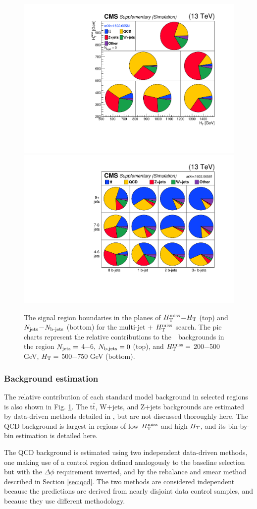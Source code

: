\begin{figure}[tb!]
\centering
\includegraphics[height=0.442\textwidth]{figures/SusySearches/Ra2b2015/aux/MC_BG_Pie_NB0.pdf}
\hspace{-1cm}
\includegraphics[height=0.445\textwidth]{figures/SusySearches/Ra2b2015/aux/MC_BG_Pie_vs_NJets_NBJets.pdf}
\caption{The signal region boundaries in the planes of $H_{\text{T}}^{\rm miss}$$-$$H_{\rm T}$ (top) and $N_{\rm jets}$$-$$N_{\text{b-jets}}$ (bottom) for the multi-jet $+$ $H_{\text{T}}^{\rm miss}$ 
search. The pie charts represent the relative contributions
 to the~\sm~backgrounds in the region $N_{\rm jets}=$ 4$-$6, $N_{\text{b-jets}}=0$ (top), and $H_{\text{T}}^{\rm miss}=$ 200$-$500 GeV, $H_{\rm T}=$ 500$-$750 GeV (bottom).}
\label{fig:ra2bArray}
\end{figure}


\subsubsection{Background estimation}
The relative contribution of each standard model background in selected regions is also shown in Fig. \ref{fig:ra2bArray}. The t$\bar{\text{t}}$, W$+$jets, and Z$+$jets backgrounds are estimated by data-driven methods detailed in  \cite{Khachatryan:2016kdk}, but are not discussed thoroughly here. The QCD background is largest in regions of low $H_{\text{T}}^{\rm miss}$ and high $H_{\rm T}$, and its bin-by-bin estimation is detailed here.

The QCD background is estimated using two independent data-driven methods, one making use of a control region defined analogously to the baseline selection but with the $\Delta\phi$ requirement inverted, and by the rebalance and smear method described in Section \ref{sec:qcd}. The two methods are considered independent because the predictions are derived from nearly disjoint data control samples, and because they use different methodology. 

